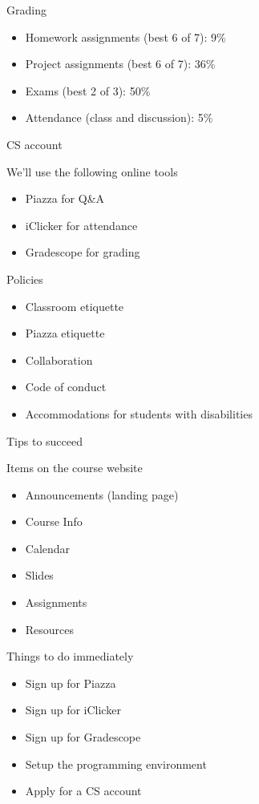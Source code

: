 \documentclass[8pt,a4paper,compress]{beamer}
\begin{document}
\begin{frame}[fragile]
\pause

Grading
\begin{itemize}
\item Homework assignments (best 6 of 7): 9\%
\item Project assignments (best 6 of 7): 36\%
\item Exams (best 2 of 3): 50\%
\item Attendance (class and discussion): 5\%
\end{itemize}

\pause
\bigskip

CS account

\pause
\bigskip

We'll use the following online tools
\begin{itemize}
\item Piazza for Q\&A
\item iClicker for attendance
\item Gradescope for grading
\end{itemize}

\pause
\bigskip

Policies
\begin{itemize}
\item Classroom etiquette
\item Piazza etiquette
\item Collaboration
\item Code of conduct
\item Accommodations for students with disabilities
\end{itemize}

\pause
\bigskip

Tips to succeed
\end{frame}

\begin{frame}[fragile]
\pause

Items on the course website
\begin{itemize}
\item Announcements (landing page)
\item Course Info
\item Calendar
\item Slides 
\item Assignments
\item Resources
\end{itemize}

\pause
\bigskip

Things to do immediately
\begin{itemize}
\item Sign up for Piazza
\item Sign up for iClicker
\item Sign up for Gradescope
\item Setup the programming environment
\item Apply for a CS account
\end{itemize}
\end{frame}
\end{document}
